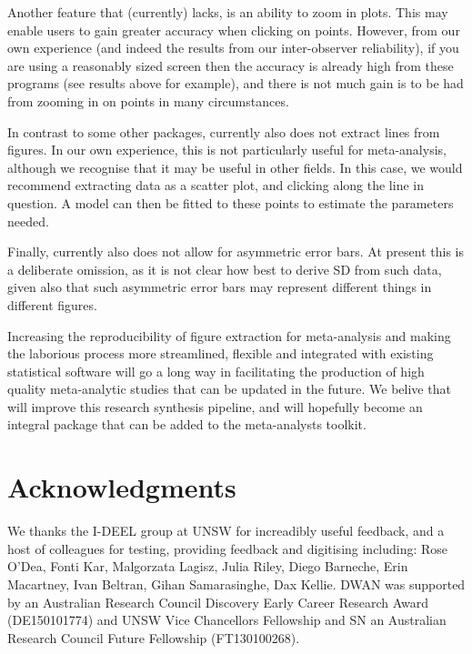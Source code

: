 \documentclass[article]{jss}
\begin{document}
Another feature that  (currently) lacks, is an ability to zoom in plots. This may enable users to gain greater accuracy when clicking on points. However, from our own experience (and indeed the results from our inter-observer reliability), if you are using a reasonably sized screen then the accuracy is already high from these programs (see results above for example), and there is not much gain is to be had from zooming in on points in many circumstances.

In contrast to some other packages,  currently also does not extract lines from figures. In our own experience, this is not particularly useful for meta-analysis, although we recognise that it may be useful in other fields. In this case, we would recommend extracting data as a scatter plot, and clicking along the line in question. A model can then be fitted to these points to estimate the parameters needed.

Finally,  currently also does not allow for asymmetric error bars. At present this is a deliberate omission, as it is not clear how best to derive SD from such data, given also that such asymmetric error bars may represent different things in different figures. 

Increasing the reproducibility of figure extraction for meta-analysis and making the laborious process more streamlined, flexible and integrated with existing statistical software will go a long way in facilitating the production of high quality meta-analytic studies that can be updated in the future. We belive that  will improve this research synthesis pipeline, and will hopefully become an integral package that can be added to the meta-analysts toolkit.


\section*{Acknowledgments}
We thanks the I-DEEL group at UNSW for increadibly useful feedback, and a host of colleagues for testing, providing feedback and digitising including: Rose O'Dea, Fonti Kar, Malgorzata Lagisz, Julia Riley, Diego Barneche, Erin Macartney, Ivan Beltran, Gihan Samarasinghe, Dax Kellie. DWAN was supported by an Australian Research Council Discovery Early Career Research Award (DE150101774) and UNSW Vice Chancellors Fellowship and SN an Australian Research Council Future Fellowship (FT130100268). 



\end{document}

